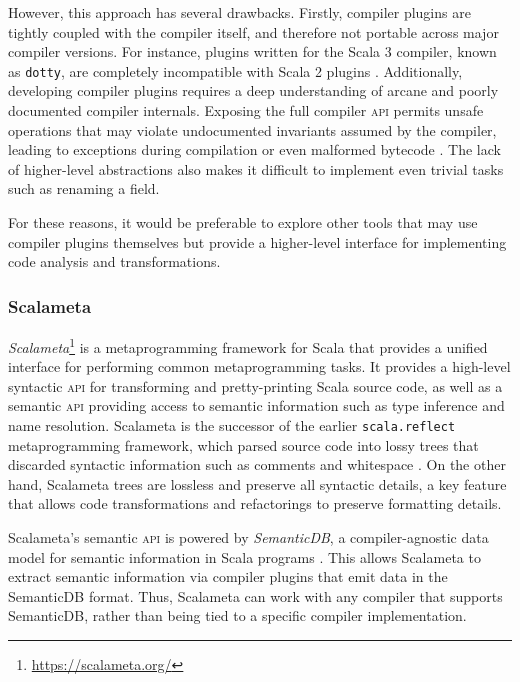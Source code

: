 However, this approach has several drawbacks.
Firstly, compiler plugins are tightly coupled with the compiler itself, and therefore not portable across major compiler versions.
For instance, plugins written for the Scala 3 compiler, known as \texttt{dotty}, are completely incompatible with Scala 2 plugins .
Additionally, developing compiler plugins requires a deep understanding of arcane and poorly documented compiler internals.
Exposing the full compiler \textsc{api} permits unsafe operations that may violate undocumented invariants assumed by the compiler, leading to exceptions during compilation or even malformed bytecode .
The lack of higher-level abstractions also makes it difficult to implement even trivial tasks such as renaming a field.

For these reasons, it would be preferable to explore other tools that may use compiler plugins themselves but provide a higher-level interface for implementing code analysis and transformations.

\subsubsection{Scalameta}
\textit{Scalameta}\footnote{\url{https://scalameta.org/}} is a metaprogramming framework for Scala that provides a unified interface for performing common metaprogramming tasks.
It provides a high-level syntactic \textsc{api} for transforming and pretty-printing Scala source code, as well as a semantic \textsc{api} providing access to semantic information such as type inference and name resolution.
Scalameta is the successor of the earlier \texttt{scala.reflect} metaprogramming framework, which parsed source code into lossy trees that discarded syntactic information such as comments and whitespace .
On the other hand, Scalameta trees are lossless and preserve all syntactic details, a key feature that allows code transformations and refactorings to preserve formatting details.

Scalameta's semantic \textsc{api} is powered by \textit{SemanticDB}, a compiler-agnostic data model for semantic information in Scala programs .
This allows Scalameta to extract semantic information via compiler plugins that emit data in the SemanticDB format.
Thus, Scalameta can work with any compiler that supports SemanticDB, rather than being tied to a specific compiler implementation.


